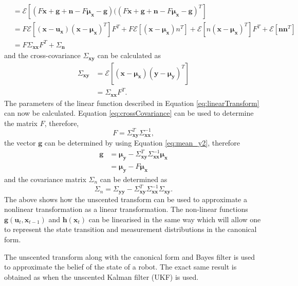 \documentclass[12pt,oneside,openany,a4paper, %
afrikaans,english,
]{memoir}
\numberwithin{equation}{chapter}
\begin{document}
{\begin{equation}
\begin{split}
& = \mathcal{E}\left[(F\bm{x} + \bm{g} + \bm{n} - F\bm{\mu_x} - \bm{g})((F\bm{x} + \bm{g} + \bm{n} - F\bm{\mu_x} - \bm{g})^T\right]\\
& = F\mathcal{E}\left[(\bm{x} - \bm{u_x})(\bm{x} - \bm{\mu_x})^T\right]F^T + F\mathcal{E}\left[(\bm{x} - \bm{\mu_x})n^T\right] + \mathcal{E}\left[n(\bm{x} - \bm{\mu_x})^T\right]F^T + \mathcal{E}\left[\bm{nn}^T\right]\\
& = F \Sigma_{\bm{xx}} F^T + \Sigma_{\bm{n}}
\end{split}
\end{equation}
and the cross-covariance $\Sigma_{\bm{xy}}$ can be calculated as
\begin{equation}\label{eq:crossCovariance}
\begin{split}
\Sigma_{\bm{xy}} & = \mathcal{E}\left[(\bm{x} - \bm{\mu_x})(\bm{y} - \bm{\mu}_{\bm{y}})^T\right]\\
& = \Sigma_{\bm{xx}}F^T.
\end{split}
\end{equation}
The parameters of the linear function described in Equation \ref{eq:linearTransform} can now be calculated. Equation \ref{eq:crossCovariance} can be used to determine the matrix $F$, therefore,
\begin{equation}
F = \Sigma_{\bm{xy}}^T\Sigma_{\bm{xx}}^{-1},
\end{equation}\label{eq:detF}
the vector $\bm{g}$ can be determined by using Equation \ref{eq:mean_y2}, therefore
\begin{equation}\label{eq:detg}
\begin{split}
\bm{g} & = \bm{\mu_y} - \Sigma_{\bm{xy}}^T \Sigma_{\bm{xx}}^{-1} \bm{\mu_x}\\
& = \bm{\mu_y} - F\bm{\mu_x}
\end{split}
\end{equation}
and the covariance matrix $\Sigma_n$ can be determined as
\begin{equation}\label{eq:detSigma_n}
\Sigma_n = \Sigma_{\bm{yy}} - \Sigma_{\bm{xy}}^T\Sigma_{\bm{xx}}^{-1}\Sigma_{\bm{xy}}.
\end{equation} 
The above shows how the unscented transform can be used to approximate a nonlinear transformation as a linear transformation. The non-linear functions $\bm{g}(\bm{u}_t, \bm{x}_{t-1})$ and $\bm{h}(\bm{x}_t)$ can be linearised in the same way which will allow one to represent the state transition and measurement distributions in the canonical form.

The unscented transform along with the canonical form and Bayes filter is used to approximate the belief of the state of a robot. The exact same result is obtained as when the unscented Kalman filter (UKF) is used.
}
\end{document}
